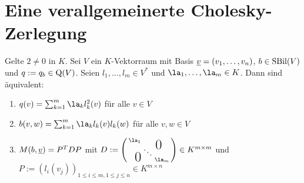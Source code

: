 \documentclass[../../main.tex]{subfiles}
\begin{document}
\section{Eine verallgemeinerte Cholesky-Zerlegung}

\begin{lem}\label{13.5.1}
	Gelte $2\neq 0$ in $K$. Sei $V$ ein $K$-Vektorraum mit Basis ${\underline v}=(v_1,\ldots ,v_n)$, $b\in \operatorname{SBil}(V)$ und $q:=q_b\in \operatorname{Q}(V)$. Seien $l_1,\ldots ,l_m\in V^*$ und $\la_1,\ldots ,\la_m\in K$. Dann sind äquivalent:
	\begin{enumerate}[\normalfont(a)]
		\item $q(v)=\sum_{k=1}^m\la_k l_k^2(v)$ für alle $v\in V$
		\item $b(v,w)=\sum_{k=1}^m\la_k l_k(v)l_k(w)$ für alle $v,w\in V$
		\item $M(b,{\underline v})=P^TDP$ mit $D:=
			\left(\begin{smallmatrix}
				\la_1 & & \llap{$\overset{\blap{\LARGE 0}}{~}$} \\
				& \ddots &\\
				\rlap{\tlap{\LARGE 0}} & & \la_m
			\end{smallmatrix}\right)\in K^{m\times m}$ und $P:=(l_i(v_j))_{1\le i\le m, 1\le j\le n}\in K^{m\times n}$
	\end{enumerate}
\end{lem}
\end{document}
